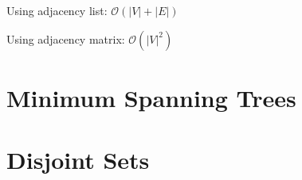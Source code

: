 \begin{minipage}[t]{0.45\linewidth} \begin{center}
    Using adjacency list: $\mathcal{O}(|V| + |E|)$
\end{center} \end{minipage}
\begin{minipage}[t]{0.45\linewidth} \begin{center}
    Using adjacency matrix: $\mathcal{O}(|V|^2)$
\end{center} \end{minipage}

\section{Minimum Spanning Trees}

\section{Disjoint Sets}